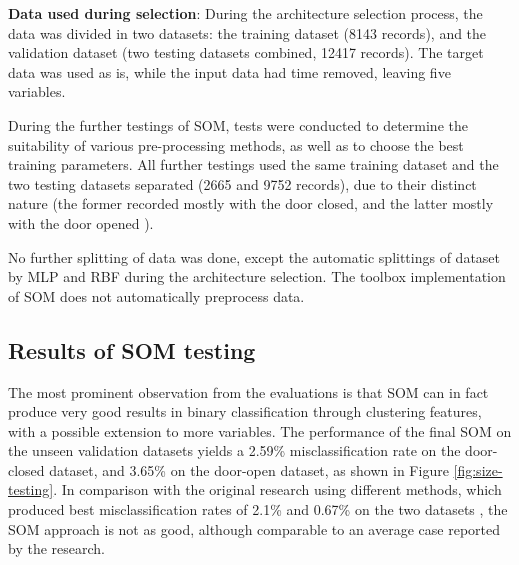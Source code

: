 \documentclass[10pt, oneside]{article}
\begin{document}
\textbf{Data used during selection}: During the architecture selection process, the data was divided in two datasets: the training dataset (8143 records), and the validation dataset (two testing datasets combined, 12417 records). The target data was used as is, while the input data had time removed, leaving five variables.

During the further testings of SOM, tests were conducted to determine the suitability of various pre-processing methods, as well as to choose the best training parameters. All further testings used the same training dataset and the two testing datasets separated (2665 and 9752 records), due to their distinct nature (the former recorded mostly with the door closed, and the latter mostly with the door opened \cite[Tb. 5]{candanedo2016accurate}). 

No further splitting of data was done, except the automatic splittings of dataset by MLP and RBF during the architecture selection. The toolbox implementation of SOM does not automatically preprocess data.

\subsection{Results of SOM testing}

The most prominent observation from the evaluations is that SOM can in fact produce very good results in binary classification through clustering features, with a possible extension to more variables. The performance of the final SOM on the unseen validation datasets yields a 2.59\% misclassification rate on the door-closed dataset, and 3.65\% on the door-open dataset, as shown in Figure \ref{fig:size-testing}. In comparison with the original research using different methods, which produced best misclassification rates of 2.1\% and 0.67\% on the two datasets \cite[p. 36]{candanedo2016accurate}, the SOM approach is not as good, although comparable to an average case reported by the research. 
\end{document}
